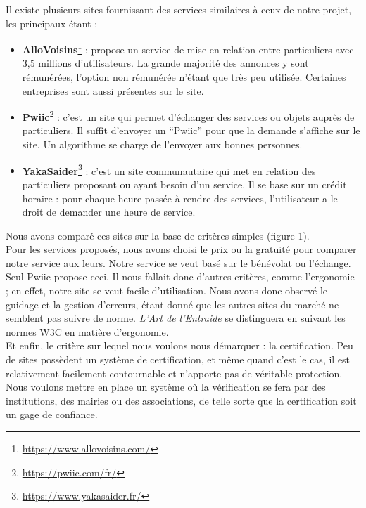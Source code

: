 \documentclass[a4paper,11pt]{article}
\begin{document}
Il existe plusieurs sites fournissant des services similaires à ceux de notre projet, les principaux étant :\\

\begin{itemize}
  \item \textbf{AlloVoisins}\footnote{\url{https://www.allovoisins.com/}} : propose un service de mise en relation entre particuliers avec 3,5 millions d'utilisateurs. La grande majorité des annonces y sont rémunérées, l’option non rémunérée
  n’étant que très peu utilisée. Certaines entreprises sont aussi présentes sur le site.

  \item \textbf{Pwiic}\footnote{\url{https://pwiic.com/fr/}} : c’est un site qui permet d’échanger des services ou objets auprès de particuliers. Il suffit d’envoyer un “Pwiic” pour que la demande s’affiche sur le site. Un algorithme se charge de
  l’envoyer aux bonnes personnes.

  \item \textbf{YakaSaider}\footnote{\url{https://www.yakasaider.fr/}} : c’est un site communautaire qui met en relation des particuliers proposant ou ayant besoin d'un service. Il se base sur un crédit horaire : pour chaque heure passée à rendre des services, l’utilisateur a le droit de demander une heure de service.
\end{itemize}

Nous avons comparé ces sites sur la base de critères simples (figure 1).\\
Pour les services proposés, nous avons choisi le prix ou la gratuité pour comparer notre service aux leurs.
Notre service se veut basé sur le bénévolat ou l'échange. Seul Pwiic propose ceci.
Il nous fallait donc d'autres critères, comme l'ergonomie ; en effet, notre site se veut facile d'utilisation.
Nous avons donc observé le guidage et la gestion d'erreurs, étant donné que les autres sites du marché ne semblent pas suivre de norme. \textit{L'Art de l'Entraide} se distinguera en suivant les normes W3C en matière d'ergonomie.\\
Et enfin, le critère sur lequel nous voulons nous démarquer : la certification.
Peu de sites possèdent un système de certification, et même quand c'est le cas, il est relativement facilement contournable et n'apporte pas de véritable protection.
Nous voulons mettre en place un système où la vérification se fera par des institutions, des mairies ou des associations, de telle sorte que la certification soit un gage de confiance.\\
\end{document}
